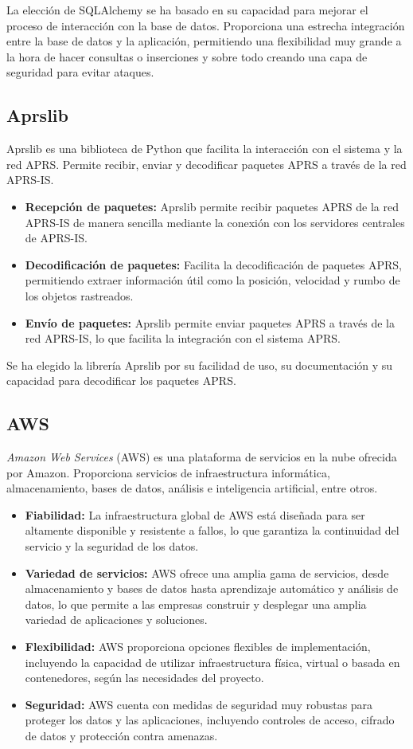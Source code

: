 \noindent La elección de SQLAlchemy se ha basado en su capacidad para mejorar el proceso de interacción con la base de datos. Proporciona una estrecha integración entre la base de datos y la aplicación, permitiendo una flexibilidad muy grande a la hora de hacer consultas o inserciones y sobre todo creando una capa de seguridad para evitar ataques.

\subsection{Aprslib}
Aprslib es una biblioteca de Python que facilita la interacción con el sistema y la red APRS. Permite recibir, enviar y decodificar paquetes APRS a través de la red APRS-IS.
\begin{itemize}
	\item \textbf{Recepción de paquetes:} Aprslib permite recibir paquetes APRS de la red APRS-IS de manera sencilla mediante la conexión con los servidores centrales de APRS-IS.
	\item \textbf{Decodificación de paquetes:} Facilita la decodificación de paquetes APRS, permitiendo extraer información útil como la posición, velocidad y rumbo de los objetos rastreados.
	\item \textbf{Envío de paquetes:} Aprslib permite enviar paquetes APRS a través de la red APRS-IS, lo que facilita la integración con el sistema APRS.
\end{itemize}
\noindent Se ha elegido la librería Aprslib por su facilidad de uso, su documentación y su capacidad para decodificar los paquetes APRS.

\subsection{AWS}
\textit{Amazon Web Services} (AWS) es una plataforma de servicios en la nube ofrecida por Amazon. Proporciona servicios de infraestructura informática, almacenamiento, bases de datos, análisis e inteligencia artificial, entre otros.

\begin{itemize}
	\item \textbf{Fiabilidad:} La infraestructura global de AWS está diseñada para ser altamente disponible y resistente a fallos, lo que garantiza la continuidad del servicio y la seguridad de los datos.
	\item \textbf{Variedad de servicios:} AWS ofrece una amplia gama de servicios, desde almacenamiento y bases de datos hasta aprendizaje automático y análisis de datos, lo que permite a las empresas construir y desplegar una amplia variedad de aplicaciones y soluciones.
	\item \textbf{Flexibilidad:} AWS proporciona opciones flexibles de implementación, incluyendo la capacidad de utilizar infraestructura física, virtual o basada en contenedores, según las necesidades del proyecto.
	\item \textbf{Seguridad:} AWS cuenta con medidas de seguridad muy robustas para proteger los datos y las aplicaciones, incluyendo controles de acceso, cifrado de datos y protección contra amenazas.
\end{itemize}

